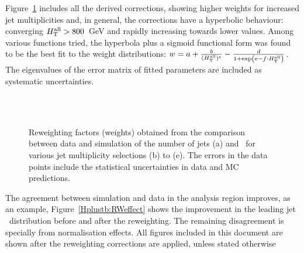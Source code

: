 Figure~\ref{Hplustb:RWfactors} includes all the derived corrections, showing higher weights for increased jet multiplicities and, in general, the \HTall corrections have a hyperbolic behaviour: converging $H_{\text{T}}^{\text{all}} > 800$~GeV and rapidly increasing towards lower values. Among various functions tried, the hyperbola plus a sigmoid functional form was found to be the best fit to the \HTall weight distributions: $w=a+\frac{b}{(H_{\text{T}}^{\text{all}})^c} - \frac{d}{1+\exp(e-f\cdot H_{\text{T}}^{\text{all}})}$. The eigenvalues of the error matrix of fitted parameters are included as systematic uncertainties. 

\begin{figure}[htb]
    \RawFloats
    \begin{center}
     \\ 
      \\
    \caption{Reweighting factors (weights) obtained from the comparison between data and simulation of the number of jets (a) and \HTall\ for various jet multiplicity selections (b) to (e).
    The errors in the data points include the statistical uncertainties in data and MC predictions.}
    \label{Hplustb:RWfactors}
\end{center}
\end{figure}

The agreement between simulation and data in the analysis region improves, as an example, Figure~\ref{Hplustb:RWeffect} shows the improvement in the leading jet \pT\ distribution before and after the reweighting. The remaining disagreement is specially from normalisation effects. All figures included in this document are shown after the reweighting corrections are applied, unless stated otherwise

